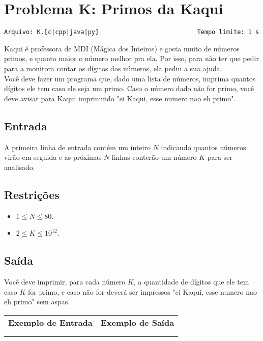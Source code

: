 \section{Problema K: Primos da Kaqui}
\vspace{-0.52cm}
\noindent \begin{verbatim}Arquivo: K.[c|cpp|java|py]                           Tempo limite: 1 s
\end{verbatim}

Kaqui é professora de MDI (Mágica dos Inteiros) e gosta muito de números primos, e quanto maior o número melhor pra ela. Por isso, para não ter que pedir para a monitora contar os dígitos dos números, ela pediu a sua ajuda. \\ Você deve fazer um programa que, dado uma lista de números, imprima quantos dígitos ele tem caso ele seja um primo. Caso o número dado não for primo, você deve avisar para Kaqui imprimindo "ei Kaqui, esse numero nao eh primo".

\subsection*{Entrada}

A primeira linha de entrada contém um inteiro $N$ indicando quantos números virão em seguida e as próximas $N$ linhas conterão um número $K$ para ser analisado.

\subsection*{Restrições}
\begin{itemize}
    \item $1 \le N \le 80$.
    \item $2 \le K \le 10^{12}$.
\end{itemize}

\subsection*{Saída}

Você deve imprimir, para cada número $K$, a quantidade de dígitos que ele tem caso $K$ for primo, e caso não for deverá ser impressos "ei Kaqui, esse numero nao eh primo" sem aspas.

\begin{flushleft}
\begin{tabularx}{1.01\textwidth}{ | p{6cm} | p{10cm} | }
\hline
\textbf{Exemplo de Entrada} & \textbf{Exemplo de Saída} \\

&

\\
\hline

&

\\
\hline
\end{tabularx}
\end{flushleft}
